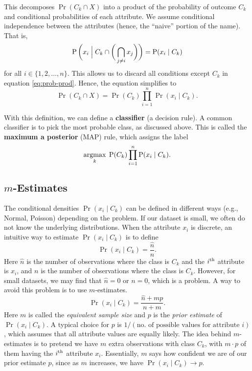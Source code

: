 \documentclass[11pt]{article}
\newcommand*{\nhat}{\widehat{n}}
\begin{document}
This decomposes $\Pr(C_k \cap X)$ into a product of the probability of outcome $C_k$
and conditional probabilities of each attribute.
We assume conditional independence between the attributes (hence, the ``naive'' portion of the name).
That is,
\begin{equation}
\Pr\bigg(x_i \Bigm\vert C_k \cap \bigg(\bigcap_{j \neq i} x_j\bigg)\bigg) = \Pr(x_i \mid C_k)
\end{equation}
for all $i \in \{1, 2, \ldots, n\}$.
This allows us to discard all conditions except $C_k$ in equation \eqref{eq:prob-prod}.
Hence, the equation simplifies to
\begin{equation}
\label{eq:naive-prod}
\Pr(C_k \cap X) = \Pr(C_k)\prod_{i=1}^n \Pr(x_i \mid C_k).
\end{equation}

With this definition, we can define a \textbf{classifier} (a decision rule).
A common classifier is to pick the most probable class, as discussed above.
This is called the \textbf{maximum a posterior} (MAP) rule, which assigns the label
\begin{equation}
\argmax_k \;\Pr(C_k)\prod_{i=1}^n \Pr(x_i \mid C_k).
\end{equation}

\subsection{\texorpdfstring{\boldmath $m$}{m}-Estimates}

The conditional densities $\Pr(x_i \mid C_k)$ can be defined in different ways (e.g., Normal, Poisson)
depending on the problem. If our dataset is small, we often do not know the underlying distributions.
When the attribute $x_i$ is discrete, an intuitive way to estimate $\Pr(x_i \mid C_k)$ is to define
\begin{equation}
\Pr(x_i \mid C_k) = \frac{\nhat}{n}.
\end{equation}
Here $\nhat$ is the number of observations where the class is $C_k$ and the $i\Th$ attribute is $x_i$,
and $n$ is the number of observations where the class is $C_k$.
However, for small datasets, we may find that $\nhat = 0$ or $n = 0$, which is a problem.
A way to avoid this problem is to use $m$-estimates.
\begin{equation}
\Pr(x_i \mid C_k) = \frac{\nhat + mp}{n + m}.
\end{equation}
Here $m$ is called the \emph{equivalent sample size} and $p$ is the \emph{prior estimate} of $\Pr(x_i \mid C_k)$.
A typical choice for $p$ is $1/(\text{no.\ of possible values for attribute } i)$, which assumes that
all attribute values are equally likely.
The idea behind $m$-estimates is to pretend we have $m$ extra observations with
class $C_k$, with $m \cdot p$ of them having the $i\Th$ attribute $x_i$.
Essentially, $m$ says how confident we are of our prior estimate $p$,
since as $m$ increases, we have $\Pr(x_i \mid C_k) \to p$.
\end{document}
